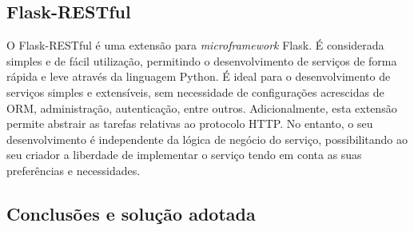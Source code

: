  





\subsection{Flask-RESTful}

O Flask-RESTful é uma extensão para \textit{microframework} Flask. É considerada simples e de fácil utilização, permitindo o desenvolvimento de serviços de forma rápida e leve através da linguagem Python. É ideal para o desenvolvimento de serviços simples e extensíveis, sem necessidade de configurações acrescidas de \ac{ORM}, administração,  autenticação, entre outros\cite{Flask-RESTful2017}.  Adicionalmente, esta extensão permite abstrair as tarefas relativas ao protocolo \ac{HTTP}. No entanto, o seu desenvolvimento é independente da lógica de negócio do serviço, possibilitando ao seu criador a liberdade de implementar o serviço tendo em conta as suas preferências e necessidades.  




\subsection{Conclusões e solução adotada}







